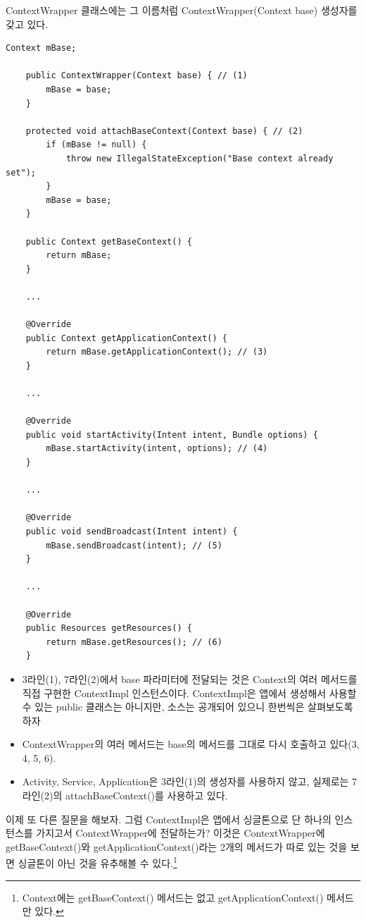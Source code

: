 ContextWrapper 클래스에는 그 이름처럼 ContextWrapper(Context base) 생성자를 갖고 있다.
\begin{lstlisting}[frame=single, caption=ContextWrapper.java]
    Context mBase;

    public ContextWrapper(Context base) { // (1)
        mBase = base;
    }

	protected void attachBaseContext(Context base) { // (2)
        if (mBase != null) {
            throw new IllegalStateException("Base context already set");
        }
        mBase = base;
    }
    
    public Context getBaseContext() {
        return mBase;
    }
    
    ...
    
    @Override
    public Context getApplicationContext() {
        return mBase.getApplicationContext(); // (3)
    }
    
    ...
    
    @Override
    public void startActivity(Intent intent, Bundle options) {
        mBase.startActivity(intent, options); // (4)
    }
    
    ...
    
    @Override
    public void sendBroadcast(Intent intent) {
        mBase.sendBroadcast(intent); // (5)
    }

	... 
	
    @Override
    public Resources getResources() {
        return mBase.getResources(); // (6)
    }
\end{lstlisting}
\begin{itemize}
\item 3라인(1), 7라인(2)에서 base 파라미터에 전달되는 것은 Context의 여러 메서드를 직접 구현한 ContextImpl 인스턴스이다. ContextImpl은 앱에서 생성해서 사용할 수 있는 public 클래스는 아니지만, 소스는 공개되어 있으니 한번씩은 살펴보도록 하자
\item ContextWrapper의 여러 메서드는 base의 메서드를 그대로 다시 호출하고 있다(3, 4, 5, 6).
\item Activity, Service, Application은 3라인(1)의 생성자를 사용하지 않고, 실제로는 7라인(2)의 attachBaseContext()를 사용하고 있다.
\end{itemize}

이제 또 다른 질문을 해보자. 그럼 ContextImpl은 앱에서 싱글톤으로 단 하나의 인스턴스를 가지고서 ContextWrapper에 전달하는가?
이것은 ContextWrapper에 getBaseContext()와 getApplicationContext()라는 2개의 메서드가 따로 있는 것을 보면 싱글톤이 아닌 것을 유추해볼 수 있다.\footnote{Context에는 getBaseContext() 메서드는 없고 getApplicationContext() 메서드만 있다.}\\

